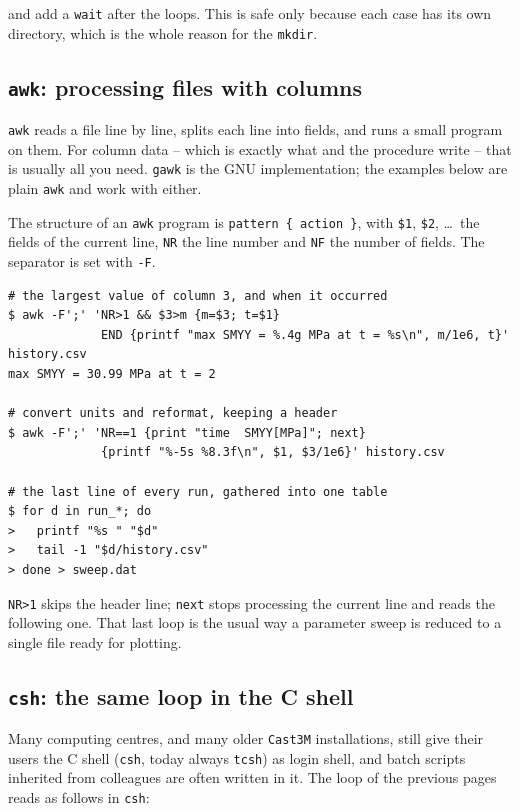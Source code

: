 \noindent and add a \texttt{wait} after the loops. This is safe only because
each case has its own directory, which is the whole reason for the
\texttt{mkdir}.

\subsection{\texttt{awk}: processing files with columns}

%
\texttt{awk} reads a file line by line, splits each line into fields, and
runs a small program on them. For column data -- which is exactly what
 and the  procedure write -- that is usually all
you need. \texttt{gawk} is the GNU implementation; the examples below are
plain \texttt{awk} and work with either.

The structure of an \texttt{awk} program is \texttt{pattern \{ action \}},
with \texttt{\$1}, \texttt{\$2}, \ldots\ the fields of the current line,
\texttt{NR} the line number and \texttt{NF} the number of fields. The
separator is set with \texttt{-F}.

\begin{codebox}
\begin{verbatim}
# the largest value of column 3, and when it occurred
$ awk -F';' 'NR>1 && $3>m {m=$3; t=$1}
             END {printf "max SMYY = %.4g MPa at t = %s\n", m/1e6, t}' history.csv
max SMYY = 30.99 MPa at t = 2

# convert units and reformat, keeping a header
$ awk -F';' 'NR==1 {print "time  SMYY[MPa]"; next}
             {printf "%-5s %8.3f\n", $1, $3/1e6}' history.csv

# the last line of every run, gathered into one table
$ for d in run_*; do
>   printf "%s " "$d"
>   tail -1 "$d/history.csv"
> done > sweep.dat
\end{verbatim}
\end{codebox}

\noindent \texttt{NR>1} skips the header line; \texttt{next} stops processing
the current line and reads the following one. That last loop is the usual way
a parameter sweep is reduced to a single file ready for plotting.

\subsection{\texttt{csh}: the same loop in the C shell}
\label{sec:py:csh}

%
Many computing centres, and many older \texttt{Cast3M} installations, still
give their users the C shell (\texttt{csh}, today always \texttt{tcsh}) as
login shell, and batch scripts inherited from colleagues are often written in
it. The loop of the previous pages reads as follows in \texttt{csh}:

